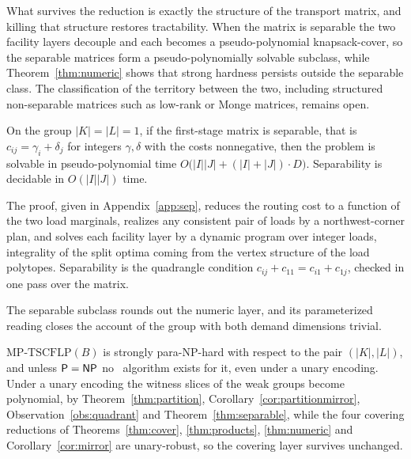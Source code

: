 What survives the reduction is exactly the structure of the transport
matrix, and killing that structure restores tractability. When the matrix
is separable the two facility layers decouple and each becomes a
pseudo-polynomial knapsack-cover, so the separable matrices form a
pseudo-polynomially solvable subclass, while
Theorem~\ref{thm:numeric} shows that strong
hardness persists outside the separable class. The classification of the territory between the two,
including structured non-separable matrices such as low-rank or Monge
matrices, remains open.

\begin{theorem}\label{thm:separable}
On the group $|K|=|L|=1$, if the first-stage matrix is separable, that is
$c_{ij}=\gamma_i+\delta_j$ for integers $\gamma,\delta$ with the costs
nonnegative, then the problem is solvable in pseudo-polynomial time
$O\bigl(|I||J|+(|I|+|J|)\cdot D\bigr)$.
Separability is decidable in $O(|I||J|)$ time.
\end{theorem}

The proof, given in Appendix~\ref{app:sep}, reduces the routing cost to a
function of the two load marginals, realizes any consistent pair of
loads by a northwest-corner plan, and solves each facility layer by a
dynamic program over integer loads, integrality of the split optima
coming from the vertex structure of the load polytopes. Separability is
the quadrangle condition $c_{ij}+c_{11}=c_{i1}+c_{1j}$, checked in one
pass over the matrix.

The separable subclass rounds out the numeric layer, and its
parameterized reading closes the account of the group with both demand
dimensions trivial.

\begin{corollary}\label{cor:unary}
$\mathrm{MP\text{-}TSCFLP}(B)$ is strongly para-NP-hard with respect to
the pair $(|K|,|L|)$, and unless $\textsf{P}=\textsf{NP}$ no \XP\ algorithm exists
for it, even under a unary encoding. Under a unary encoding the witness slices of the weak
groups become polynomial, by Theorem~\ref{thm:partition},
Corollary~\ref{cor:partitionmirror}, Observation~\ref{obs:quadrant} and
Theorem~\ref{thm:separable},
while the four covering reductions of
Theorems~\ref{thm:cover}, \ref{thm:products}, \ref{thm:numeric} and
Corollary~\ref{cor:mirror} are unary-robust, so the covering layer
survives unchanged.
\end{corollary}


